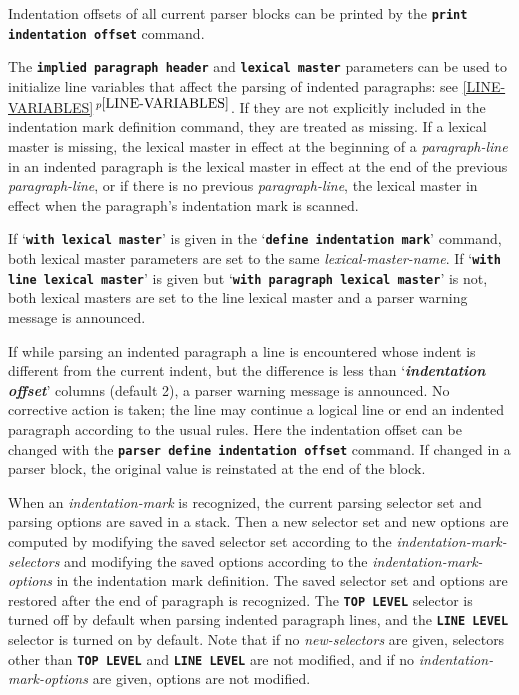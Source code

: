 \documentclass[12pt]{article}
\newcommand{\TT}[1]{{\tt \bfseries #1}}
\newcommand{\key}[1]{{\bf \em #1}\index{#1}}
\newcommand{\itemref}[1]{\ref{#1}$\,^{p\pageref{#1}}$}
\begin{document}
Indentation offsets of all current parser blocks can be printed by the
\TT{print indentation offset} command.

The \TT{implied paragraph header} and \TT{lexical master} parameters
can be used to initialize line variables
that affect the parsing of indented paragraphs: see \itemref{LINE-VARIABLES}.
If they are not explicitly included in the indentation mark definition command,
they are treated as missing.  If a lexical master is missing,
the lexical master in effect at the beginning of a {\em paragraph-line}
in an indented paragraph
is the lexical master in effect at the end of the previous
{\em paragraph-line}, or if there is no previous {\em paragraph-line},
the lexical master in effect when the paragraph's
indentation mark is scanned.

If `\TT{with lexical master}' is given in the `\TT{define indentation mark}'
command, both lexical master parameters are set to the same
{\em lexical-master-name}.  If `\TT{with line lex\-ical master}' is
given but `\TT{with paragraph lexical master}' is not, both lexical
masters are set to the line lexical master and a parser warning message
is announced.

If while parsing an indented paragraph a line is encountered whose
indent is different from the current indent,
but the difference is less than `\key{indentation offset}'
columns (default 2),
a parser warning message is announced.
No corrective action is taken; the line may continue a logical line
or end an indented paragraph according to the usual rules.
Here the indentation offset can be
changed with the \TT{parser define indentation offset} command.
If changed in a parser block, the original value is reinstated at the
end of the block.

When an {\em indentation-mark} is recognized, the current parsing
selector set and parsing options are saved in a stack.
Then a new selector set and new options are computed by modifying
the saved selector set
according to the {\em indentation-mark-selectors}
and modifying the saved options according
to the {\em indentation-mark-options} in the indentation mark definition.
The saved selector set and options
are restored after the end of paragraph is recognized.
The \TT{TOP LEVEL} selector is turned off by default when parsing indented
paragraph lines, and the \TT{LINE LEVEL} selector is turned on by default.
Note that if no {\em new-selectors} are given, selectors
other than \TT{TOP LEVEL} and \TT{LINE LEVEL}
are not modified, and if no {\em indentation-mark-options} 
are given, options are not modified.
\end{document}
